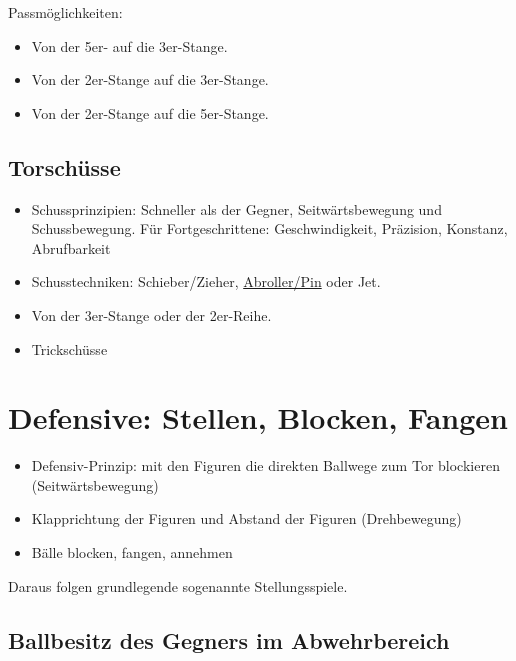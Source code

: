 Passmöglichkeiten:
\begin{itemize}
\item Von der 5er- auf die 3er-Stange.
\item Von der 2er-Stange auf die 3er-Stange.
\item Von der 2er-Stange auf die 5er-Stange.
\end{itemize}


\subsection{Torschüsse}
\label{technik:offensive:torschuesse}

\begin{itemize}
\item Schussprinzipien: Schneller als der Gegner, Seitwärtsbewegung und Schussbewegung. Für Fortgeschrittene: Geschwindigkeit, Präzision, Konstanz, Abrufbarkeit
\item Schusstechniken: Schieber/Zieher, \href{http://ungeblogtkickern.blogspot.de/2014/07/schritt-fur-schritt-pin-schieen.html}{Abroller/Pin} oder Jet.
\item Von der 3er-Stange oder der 2er-Reihe.
\item Trickschüsse
\end{itemize}





\section{Defensive: Stellen, Blocken, Fangen}
\label{technik:defensive}

\begin{itemize}
\item Defensiv-Prinzip: mit den Figuren die direkten Ballwege zum Tor blockieren (Seitwärtsbewegung)  
\item Klapprichtung der Figuren und Abstand der Figuren (Drehbewegung)
\item Bälle blocken, fangen, annehmen 
\end{itemize}
Daraus folgen grundlegende sogenannte Stellungsspiele.


\subsection{Ballbesitz des Gegners im Abwehrbereich}
\label{technik:defensive:gegnerabwehr}

